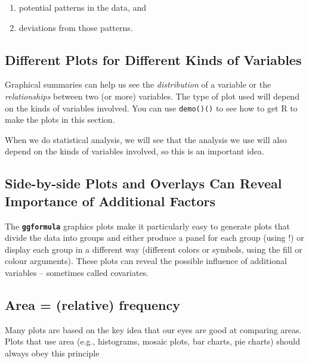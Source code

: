 \documentclass[]{book}
\providecommand{\tightlist}{%
  \setlength{\itemsep}{0pt}\setlength{\parskip}{0pt}}
\begin{document}
\begin{enumerate}
\tightlist
\item
  potential patterns in the data, and
\item
  deviations from those patterns.\\
\end{enumerate}

\hypertarget{different-plots-for-different-kinds-of-variables}{%
\subsection{Different Plots for Different Kinds of Variables}\label{different-plots-for-different-kinds-of-variables}}

Graphical summaries can help us see the \emph{distribution} of a variable
or the \emph{relationships} between two (or more) variables. The type of plot
used will depend on the kinds of variables involved. You can use \texttt{demo()()} to see how
to get R to make the plots in this section.

When we do statistical analysis, we will see that the analysis we use will
also depend on the kinds of variables involved, so this is an important idea.

\hypertarget{side-by-side-plots-and-overlays-can-reveal-importance-of-additional-factors}{%
\subsection{Side-by-side Plots and Overlays Can Reveal Importance of Additional Factors}\label{side-by-side-plots-and-overlays-can-reveal-importance-of-additional-factors}}

The \textbf{\texttt{ggformula}} graphics plots make it particularly easy to generate plots that
divide the data into groups and either produce a panel for each group (using \textbar!)
or display each group in a different way (different colors or symbols, using
the {fill} or {colour} arguments). These plots can reveal the
possible influence of additional variables -- sometimes called covariates.

\hypertarget{area-relative-frequency}{%
\subsection{Area = (relative) frequency}\label{area-relative-frequency}}

Many plots are based on the key idea that our eyes are good at comparing areas. Plots
that use area (e.g., histograms, mosaic plots, bar charts, pie charts) should always obey
this principle
\end{document}
